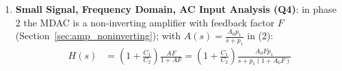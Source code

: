 \begin{enumerate}
\begin{align*}
      = -V_{OUT}\left(C_2 + \frac{C_1 + C_2 + C_{in}}{A}\right) \\
      V_{OUT} &= \frac{(C_1 + C_2) V_{IN} - C_1 b V_{REF}}{C_2\left(1 + \frac{C_1 + C_2 + C_{in}}{A C_2}\right)}
      = \left[\left(1 + \frac{C_1}{C_2}\right) V_{IN} - \frac{C_1}{C_2} b V_{REF}\right] \frac{1}{1 + \frac{1}{AF}} \tag{2}
    \end{align*}
    with feedback factor \(F = \frac{C_2}{C_1 + C_2 + C_{in}}\): the residue is
    scaled by \(\frac{1}{1 + \frac{1}{AF}} = \frac{AF}{1 + AF}\) (Section~\ref{sec:devices_opamp}).
  \item \textbf{Small Signal, Frequency Domain, AC Input Analysis (Q4)}: in phase 2 the MDAC is a
    non-inverting amplifier with feedback factor \(F\) (Section~\ref{sec:amp_noninverting}); with
    \(A(s) = \frac{A_0 p_1}{s + p_1}\) in (2):
    \begin{align*}
      H(s) &= \left(1 + \frac{C_1}{C_2}\right)\frac{A F}{1 + AF} = \left(1 + \frac{C_1}{C_2}\right)\frac{A_0 F p_1}{s + p_1(1 + A_0 F)} \tag{3}
    \end{align*}
\end{enumerate}

